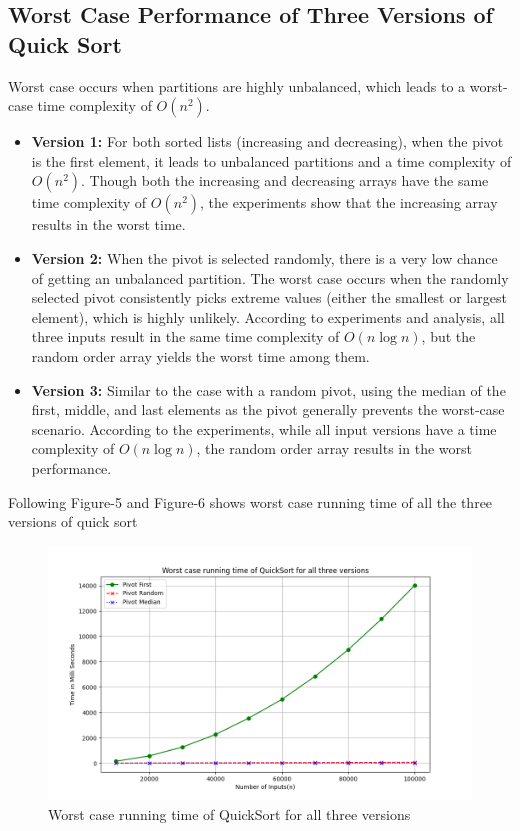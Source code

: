 \documentclass[a4paper,12pt]{report}
\begin{document}
\subsection{Worst Case Performance of Three Versions of Quick Sort}
Worst case occurs when partitions are highly unbalanced, which leads to a worst-case time complexity of \(O(n^2)\).
\begin{itemize}
    \item \textbf{Version 1:} For both sorted lists (increasing and decreasing), when the pivot is the first element, it leads to unbalanced partitions and a time complexity of \(O(n^2)\). Though both the increasing and decreasing arrays have the same time complexity of \(O(n^2)\), the experiments show that the increasing array results in the worst time.

    \item \textbf{Version 2:} When the pivot is selected randomly, there is a very low chance of getting an unbalanced partition. The worst case occurs when the randomly selected pivot consistently picks extreme values (either the smallest or largest element), which is highly unlikely. According to experiments and analysis, all three inputs result in the same time complexity of \(O(n \log n)\), but the random order array yields the worst time among them.

    \item \textbf{Version 3:} Similar to the case with a random pivot, using the median of the first, middle, and last elements as the pivot generally prevents the worst-case scenario. According to the experiments, while all input versions have a time complexity of \(O(n \log n)\), the random order array results in the worst performance.

\end{itemize}
Following Figure-5 and Figure-6 shows worst case running time of all the three versions of quick sort
\begin{figure}[H]
    \centering
    \includegraphics[width=1.1\textwidth]{./Worst_case_QuickSort.png}
    \caption{Worst case running time of QuickSort for all three versions}
    \label{fig:quicksort_median_pivot}
\end{figure}
\end{document}
